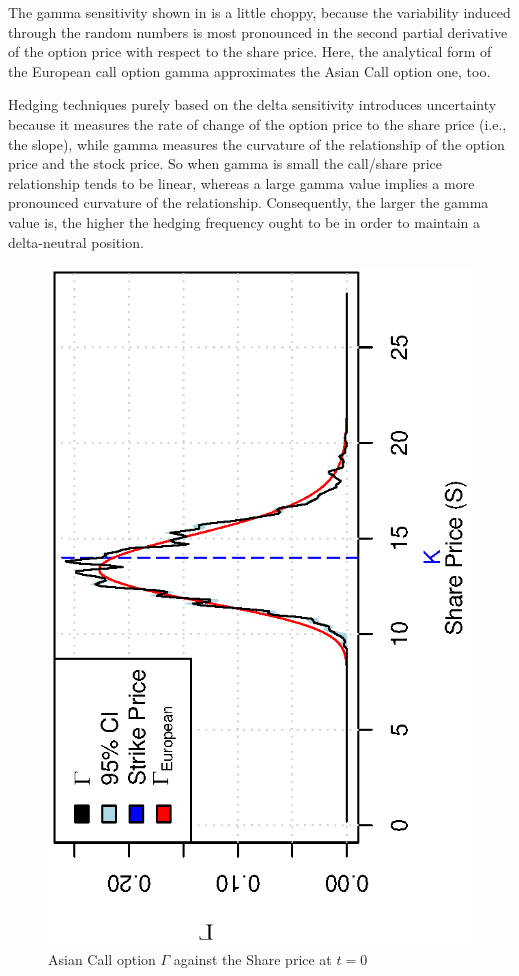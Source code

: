 \documentclass[12pt,a4paper]{article}
\begin{document}
The gamma sensitivity shown in  is a
little choppy, because the variability induced through the random
numbers is most pronounced in the second partial derivative of the
option price with respect to the share price. Here, the analytical
form of the European call option gamma approximates the Asian Call
option one, too.

Hedging techniques purely based on the delta sensitivity introduces
uncertainty because it measures the rate of change of the option price
to the share price (i.e., the slope), while gamma measures the
curvature of the relationship of the option price and the stock
price. So when gamma is small the call/share price relationship tends
to be linear, whereas a large gamma value implies a more pronounced
curvature of the relationship. Consequently, the larger the gamma
value is, the higher the hedging frequency ought to be in order to
maintain a delta-neutral position.

\begin{figure}[!ht]
  \centering
  \includegraphics[scale=0.85,angle=-90]{./images/pseudo/gamma_share.eps}
  \caption{Asian Call option $\Gamma$ against the Share price at $t=0$}
  \label{fig:gamma-share}
\end{figure}
\end{document}
